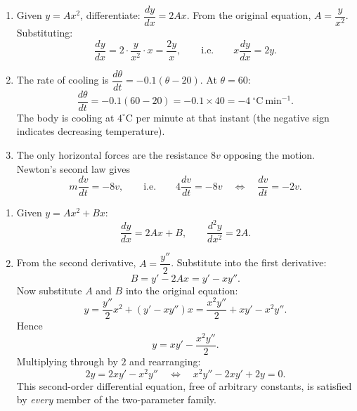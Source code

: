 \documentclass[11pt]{article}
\begin{document}
\begin{corrige}
\begin{enumerate}
\item Given $y = Ax^2$, differentiate: $\dfrac{dy}{dx} = 2Ax$. From the original equation, $A = \dfrac{y}{x^2}$. Substituting:
\[
\frac{dy}{dx} = 2\cdot\frac{y}{x^2}\cdot x = \frac{2y}{x},
\qquad\text{i.e.}\qquad x\frac{dy}{dx} = 2y.
\]

\item The rate of cooling is $\dfrac{d\theta}{dt} = -0.1(\theta - 20)$. At $\theta = 60$:
\[
\frac{d\theta}{dt} = -0.1(60 - 20) = -0.1 \times 40 = -4\ ^{\circ}\mathrm{C\ min^{-1}}.
\]
The body is cooling at $4^{\circ}$C per minute at that instant (the negative sign indicates decreasing temperature).

\item The only horizontal forces are the resistance $8v$ opposing the motion. Newton's second law gives
\[
m\frac{dv}{dt} = -8v, \qquad\text{i.e.}\qquad 4\frac{dv}{dt} = -8v
\quad\Longleftrightarrow\quad \frac{dv}{dt} = -2v.
\]
\end{enumerate}
\end{corrige}

\begin{corrige}
\begin{enumerate}
\item Given $y = Ax^2 + Bx$:
\[
\frac{dy}{dx} = 2Ax + B, \qquad \frac{d^2y}{dx^2} = 2A.
\]

\item From the second derivative, $A = \dfrac{y''}{2}$. Substitute into the first derivative:
\[
B = y' - 2Ax = y' - xy''.
\]
Now substitute $A$ and $B$ into the original equation:
\[
y = \frac{y''}{2}x^2 + \left(y' - xy''\right)x = \frac{x^2 y''}{2} + xy' - x^2 y''.
\]
Hence
\[
y = xy' - \frac{x^2 y''}{2}.
\]
Multiplying through by $2$ and rearranging:
\[
2y = 2xy' - x^2 y'' \quad\Longleftrightarrow\quad \boxed{x^2 y'' - 2xy' + 2y = 0}.
\]
This second-order differential equation, free of arbitrary constants, is satisfied by \emph{every} member of the two-parameter family.
\end{enumerate}
\end{corrige}
\end{document}
